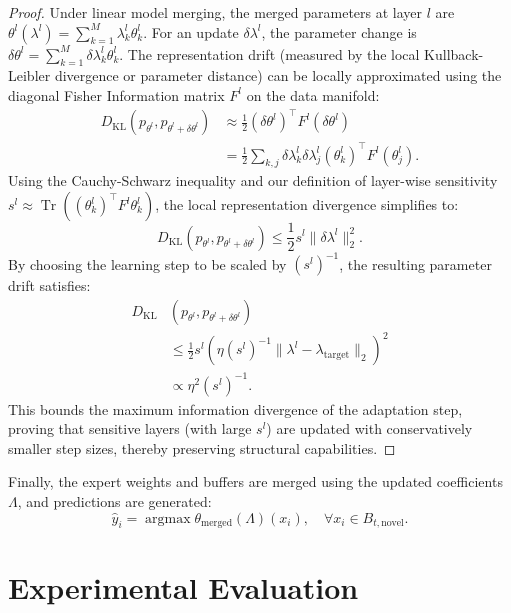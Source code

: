 \documentclass{article}
\theoremstyle{plain}
\theoremstyle{definition}
\theoremstyle{remark}
\begin{document}
\begin{proof}
Under linear model merging, the merged parameters at layer $l$ are $\theta^l(\lambda^l) = \sum_{k=1}^M \lambda_k^l \theta_k^l$. For an update $\delta \lambda^l$, the parameter change is $\delta \theta^l = \sum_{k=1}^M \delta \lambda_k^l \theta_k^l$. 
The representation drift (measured by the local Kullback-Leibler divergence or parameter distance) can be locally approximated using the diagonal Fisher Information matrix $F^l$ on the data manifold:
\begin{align}
    D_{\mathrm{KL}}(p_{\theta^l}, p_{\theta^l + \delta \theta^l}) &\approx \frac{1}{2} (\delta \theta^l)^\top F^l (\delta \theta^l) \\
    &= \frac{1}{2} \sum_{k, j} \delta \lambda_k^l \delta \lambda_j^l (\theta_k^l)^\top F^l (\theta_j^l).
\end{align}
Using the Cauchy-Schwarz inequality and our definition of layer-wise sensitivity $s^l \approx \operatorname{Tr}((\theta_k^l)^\top F^l \theta_k^l)$, the local representation divergence simplifies to:
\begin{equation}
    D_{\mathrm{KL}}(p_{\theta^l}, p_{\theta^l + \delta \theta^l}) \le \frac{1}{2} s^l \|\delta \lambda^l\|_2^2.
\end{equation}
By choosing the learning step to be scaled by $(s^l)^{-1}$, the resulting parameter drift satisfies:
\begin{align}
    D_{\mathrm{KL}}&(p_{\theta^l}, p_{\theta^l + \delta \theta^l}) \nonumber \\
    &\le \frac{1}{2} s^l \left( \eta (s^l)^{-1} \|\lambda^l - \lambda_{\mathrm{target}}\|_2 \right)^2 \nonumber \\
    &\propto \eta^2 (s^l)^{-1}.
\end{align}
This bounds the maximum information divergence of the adaptation step, proving that sensitive layers (with large $s^l$) are updated with conservatively smaller step sizes, thereby preserving structural capabilities.
\end{proof}

Finally, the expert weights and buffers are merged using the updated coefficients $\Lambda$, and predictions are generated:
\begin{equation}
    \hat{y}_i = \operatorname{argmax} \theta_{\text{merged}}(\Lambda)(x_i), \quad \forall x_i \in B_{t, \text{novel}}.
\end{equation}

\section{Experimental Evaluation}
\label{submission_experiments}
\end{document}
